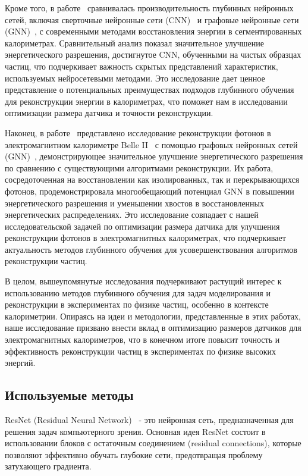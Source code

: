 \documentclass[a4paper,12pt]{extarticle}
\begin{document}
Кроме того, в работе~\cite{Akchurin_2021} сравнивалась производительность глубинных нейронных сетей, включая сверточные нейронные сети (CNN)~\cite{oshea2015introduction} и графовые нейронные сети (GNN)~\cite{zhou2021graph}, с современными методами восстановления энергии в сегментированных калориметрах. Сравнительный анализ показал значительное улучшение энергетического разрешения, достигнутое CNN, обученными на чистых образцах частиц, что подчеркивает важность скрытых представлений характеристик, используемых нейросетевыми методами. Это исследование дает ценное представление о потенциальных преимуществах подходов глубинного обучения для реконструкции энергии в калориметрах, что поможет нам в исследовании оптимизации размера датчика и точности реконструкции.

Наконец, в работе~\cite{Wemmer_2023} представлено исследование реконструкции фотонов в электромагнитном калориметре Belle II~\cite{KUZMIN2020162235} с помощью графовых нейронных сетей (GNN)~\cite{zhou2021graph}, демонстрирующее значительное улучшение энергетического разрешения по сравнению с существующими алгоритмами реконструкции. Их работа, сосредоточенная на восстановлении как изолированных, так и перекрывающихся фотонов, продемонстрировала многообещающий потенциал GNN в повышении энергетического разрешения и уменьшении хвостов в восстановленных энергетических распределениях. Это исследование совпадает с нашей исследовательской задачей по оптимизации размера датчика для улучшения реконструкции фотонов в электромагнитных калориметрах, что подчеркивает актуальность методов глубинного обучения для усовершенствования алгоритмов реконструкции частиц.

В целом, вышеупомянутые исследования подчеркивают растущий интерес к использованию методов глубинного обучения для задач моделирования и реконструкции в экспериментах по физике частиц, особенно в контексте калориметрии. Опираясь на идеи и методологии, представленные в этих работах, наше исследование призвано внести вклад в оптимизацию размеров датчиков для электромагнитных калориметров, что в конечном итоге повысит точность и эффективность реконструкции частиц в экспериментах по физике высоких энергий.

\subsection{Используемые методы}
\label{subsection:used_methods}

ResNet (Residual Neural Network)~\cite{he2015deep} - это нейронная сеть, предназначенная для решения задач компьютерного зрения. Основная идея ResNet состоит в использовании блоков с остаточным соединением (residual connections), которые позволяют эффективно обучать глубокие сети, предотвращая проблему затухающего градиента.
\end{document}
